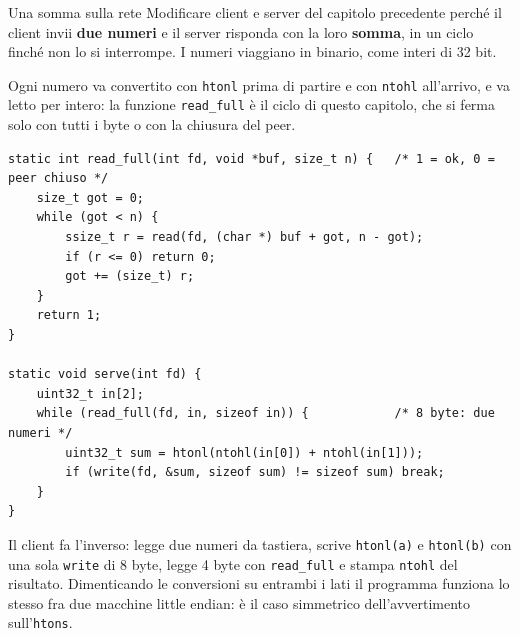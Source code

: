 \begin{esercizio}{Una somma sulla rete}
Modificare client e server del capitolo precedente perché il client invii \textbf{due numeri} e il server risponda con la
loro \textbf{somma}, in un ciclo finché non lo si interrompe. I numeri viaggiano in binario, come interi di 32 bit.

\svolgimento
Ogni numero va convertito con \texttt{htonl} prima di partire e con \texttt{ntohl} all'arrivo, e va letto per intero: la
funzione \texttt{read\_full} è il ciclo di questo capitolo, che si ferma solo con tutti i byte o con la chiusura del peer.

\begin{lstlisting}[language={[POSIX]C}, style=wnumbers, title={Lato server: la conversazione}]
static int read_full(int fd, void *buf, size_t n) {   /* 1 = ok, 0 = peer chiuso */
    size_t got = 0;
    while (got < n) {
        ssize_t r = read(fd, (char *) buf + got, n - got);
        if (r <= 0) return 0;
        got += (size_t) r;
    }
    return 1;
}

static void serve(int fd) {
    uint32_t in[2];
    while (read_full(fd, in, sizeof in)) {            /* 8 byte: due numeri */
        uint32_t sum = htonl(ntohl(in[0]) + ntohl(in[1]));
        if (write(fd, &sum, sizeof sum) != sizeof sum) break;
    }
}
\end{lstlisting}

Il client fa l'inverso: legge due numeri da tastiera, scrive \texttt{htonl(a)} e \texttt{htonl(b)} con una sola
\texttt{write} di 8 byte, legge 4 byte con \texttt{read\_full} e stampa \texttt{ntohl} del risultato. Dimenticando le
conversioni su entrambi i lati il programma funziona lo stesso fra due macchine little endian: è il caso simmetrico
dell'avvertimento sull'\texttt{htons}.
\end{esercizio}

